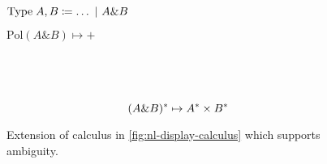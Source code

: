 \begin{figure}[h]
  \begin{mdframed}
    \centering
    \vspace*{1\baselineskip}
    \begin{minipage}{0.666\linewidth}
      \centering
      \(\text{Type}\;A,B\coloneqq\ldots\vsep A\& B\)
    \end{minipage}%
    \begin{minipage}{0.333\linewidth}
      \centering
      \(\text{Pol}(A \& B) \mapsto {+}\)
    \end{minipage}
    \\[1\baselineskip]
    \begin{pfbox}
    \end{pfbox}
    \begin{pfbox}
    \end{pfbox}
    \begin{pfbox}
    \end{pfbox}
    \\[1\baselineskip]
    \hrulefill
    \[
      \tr[(A\& B)] \mapsto \tr[A]\times\tr[B]
    \]
    \begin{pfblock}
    \end{pfblock}
    \begin{pfblock}
    \end{pfblock}
    \begin{pfblock}
    \end{pfblock}
    \vspace*{0.5\baselineskip}
  \end{mdframed}
  \caption{
    Extension of calculus in \autoref{fig:nl-display-calculus} which supports ambiguity.}%
  \label{fig:extension-lexical-ambiguity}
\end{figure}

